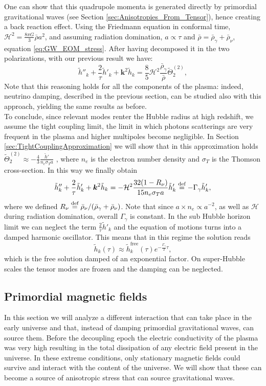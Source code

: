 One can show that this quadrupole momenta is generated directly by primordial gravitational waves (see Section \ref{sec:Anisotropies_From_Tensor}), hence creating a back reaction effect. Using the Friedmann equation in conformal time, $\mathcal{H}^2=\tfrac{8\pi G}{3}\bar\rho a^2$, and assuming radiation domination, $a\propto \tau$ and $\bar\rho=\bar\rho_\gamma+\bar\rho_\nu$, equation \eqref{eq:GW_EOM_stress}. After having decomposed it in the two polarizations, with our previous result we have:
$$
    \tilde h''_{k}+\frac{2}{\tau}\tilde h'_{k}+\boldsymbol{k}^2 \tilde h_{k}=\frac{8}{5}\mathcal{H}^2\frac{\bar\rho_\gamma}{\bar\rho}\tilde\Theta_2^{(2)},
$$
Note that this reasoning holds for all the components of the plasma: indeed, neutrino damping, described in the previous section, can be studied also with this approach, yielding the same results as before.\\
To conclude, since relevant modes renter the Hubble radius at high redshift, we assume the tight coupling limit, the limit in which photons scatterings are very frequent in the plasma and higher multipoles become negligible. In Section \ref{sec:TightCouplingApproximation} we will show that in this approximation holds $\tilde\Theta^{(2)}_2\approx-\tfrac43\tfrac{\tilde h'}{n_e\sigma_T a}$ ,
where $n_e$ is the electron number density and $\sigma_T$ is the Thomson cross-section. In this way we finally obtain 
$$
    \tilde h''_{k}+\frac{2}{\tau}\tilde h'_{k}+\boldsymbol{k}^2 \tilde h_{k}=-\mathcal{H}^2\frac{32(1-R_\nu)}{15n_e\sigma_T a}\tilde h'_{k}\stackrel{\text{def}}{=} -\Gamma_\gamma \tilde h'_k,
$$
where we defined $R_\nu\stackrel{\text{def}}{=}\bar\rho_\nu/(\bar\rho_\gamma+\bar\rho_\nu)$. Note that since $a\times n_e\propto a^{-2}$, as well as $\mathcal{H}$ during radiation domination, overall $\Gamma_\gamma$ is constant. In the sub Hubble horizon limit we can neglect the term $\tfrac2\tau \tilde h'_k$ and the equation of motions turns into a damped harmonic oscillator. This means that in this regime the solution reads 
\begin{equation}
    \tilde h_k(\tau)\approx\tilde h_k^{\text{free}}(\tau)e^{-\frac{\Gamma_\gamma}{2}\tau},
\end{equation} 
which is the free solution damped of an exponential factor. On super-Hubble scales the tensor modes are frozen and the damping can be neglected.
\subsection{Primordial magnetic fields}
\label{sec:primordial_magn}
In this section we will analyze a different interaction that can take place in the early universe and that, instead of damping primordial gravitational waves, can source them. Before the decoupling epoch the electric conductivity of the plasma was very high resulting in the total dissipation of any electric field present in the universe. In these extreme conditions, only stationary magnetic fields could survive and interact with the content of the universe. We will show that these can become a source of anisotropic stress that can source gravitational waves.

